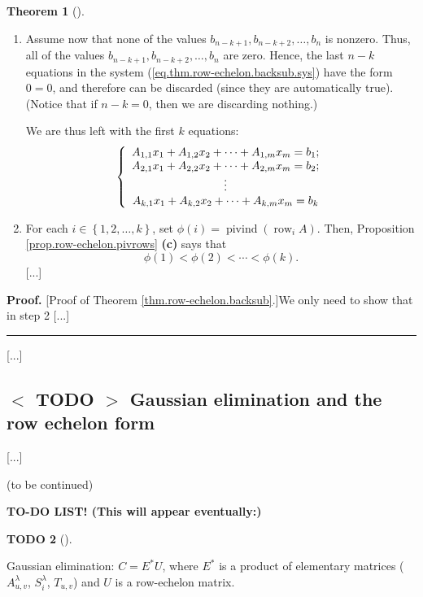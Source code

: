 \documentclass[numbers=enddot,12pt,final,onecolumn,notitlepage]{scrartcl}%
\theoremstyle{definition}
\newtheorem{theo}{Theorem}[section]
\newenvironment{theorem}[1][]
{\begin{theo}[#1]\begin{leftbar}}
{\end{leftbar}\end{theo}}
\newtheorem{quest}[theo]{TODO}
\newenvironment{todo}[1][]
{\begin{quest}[#1]\begin{leftbar}}
{\end{leftbar}\end{quest}}
\newenvironment{proof}[1][Proof]{\noindent\textbf{#1.} }{\ \rule{0.5em}{0.5em}}
\begin{document}
\begin{theorem}
\begin{enumerate}
\item Assume now that none of the values $b_{n-k+1},b_{n-k+2},\ldots,b_{n}$ is
nonzero. Thus, all of the values $b_{n-k+1},b_{n-k+2},\ldots,b_{n}$ are zero.
Hence, the last $n-k$ equations in the system
(\ref{eq.thm.row-echelon.backsub.sys}) have the form $0=0$, and therefore can
be discarded (since they are automatically true). (Notice that if $n-k=0$,
then we are discarding nothing.)

We are thus left with the first $k$ equations:%
\begin{equation}
\left\{
\begin{array}
[c]{c}%
A_{1,1}x_{1}+A_{1,2}x_{2}+\cdots+A_{1,m}x_{m}=b_{1};\\
A_{2,1}x_{1}+A_{2,2}x_{2}+\cdots+A_{2,m}x_{m}=b_{2};\\
\vdots\\
A_{k,1}x_{1}+A_{k,2}x_{2}+\cdots+A_{k,m}x_{m}=b_{k}%
\end{array}
\right.  \label{eq.thm.row-echelon.backsub.sysk}%
\end{equation}


\item For each $i\in\left\{  1,2,\ldots,k\right\}  $, set $\phi\left(
i\right)  =\operatorname*{pivind}\left(  \operatorname*{row}\nolimits_{i}%
A\right)  $. Then, Proposition \ref{prop.row-echelon.pivrows} \textbf{(c)}
says that%
\[
\phi\left(  1\right)  <\phi\left(  2\right)  <\cdots<\phi\left(  k\right)  .
\]
[...]
\end{enumerate}
\end{theorem}

\begin{proof}
[Proof of Theorem \ref{thm.row-echelon.backsub}.]We only need to show that in
step 2 [...]
\end{proof}

[...]

\subsection{\label{sect.gauss.gauss}%
$<$%
TODO%
$>$
Gaussian elimination and the row echelon form}

[...]

(to be continued)

\textbf{TO-DO LIST! (This will appear eventually:)}

\begin{todo}
Gaussian elimination: $C=E^{\ast}U$, where $E^{\ast}$ is a product of
elementary matrices ($A_{u,v}^{\lambda}$, $S_{i}^{\lambda}$, $T_{u,v}$) and
$U$ is a row-echelon matrix.
\end{todo}
\end{document}
